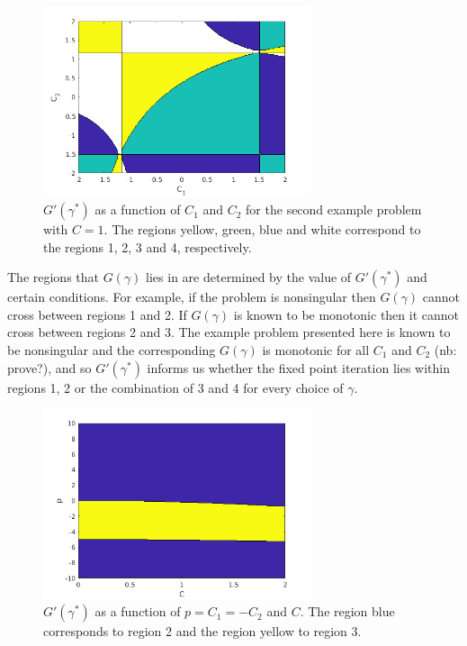\documentclass{article}
\begin{document}
\begin{figure}
\centering
\includegraphics[width=0.7\textwidth]{exp12_01.png}
\caption{$G'(\gamma^*)$ as a function of $C_1$ and $C_2$ for the second example problem with $C=1$.
The regions yellow, green, blue and white correspond to the regions 1, 2, 3 and 4, respectively.}
\end{figure}

The regions that $G(\gamma)$ lies in are determined by the value of $G'(\gamma^*)$ and certain conditions.
For example, if the problem is nonsingular then $G(\gamma)$ cannot cross between regions 1 and 2.
If $G(\gamma)$ is known to be monotonic then it cannot cross between regions 2 and 3.
The example problem presented here is known to be nonsingular and the corresponding $G(\gamma)$ is monotonic for all $C_1$ and $C_2$ (nb: prove?), and so $G'(\gamma^*)$ informs us whether the fixed point iteration lies within regions 1, 2 or the combination of 3 and 4 for every choice of $\gamma$.

\begin{figure}
\centering
\includegraphics[width=0.7\textwidth]{exp12_02.png}
\caption{$G'(\gamma^*)$ as a function of $p = C_1 = -C_2$ and $C$.
The region blue corresponds to region 2 and the region yellow to region 3.}
\end{figure}
\end{document}
